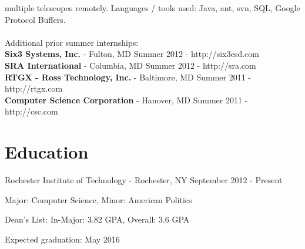 \documentclass[a4paper,margin,line]{resume}
\newcommand{\rdate}[1]{\hfill {\small #1}}
\begin{document}
\begin{resume}
\begin{asparadesc}
        multiple telescopes remotely. Languages / tools used: Java, ant, svn, SQL,
        Google Protocol Buffers.
        \normalsize
        \\
        \\
        Additional prior summer internships:\\
        \textbf{Six3 Systems, Inc.} - Fulton, MD \hfill Summer 2012 - http://six3esd.com \\
        \textbf{SRA International} - Columbia, MD \hfill Summer 2012 - http://sra.com \\
        \textbf{RTGX - Ross Technology, Inc.} - Baltimore, MD \hfill Summer 2011 - http://rtgx.com \\
        \textbf{Computer Science Corporation} - Hanover, MD \hfill Summer 2011 - http://csc.com
    \end{asparadesc}

\section{\mysidestyle Education}
	\begin{compactdesc}
		\item[Rochester Institute of Technology] - Rochester, NY \rdate{September 2012 - Present}
		\begin{compactitem} { \small
			\item Major: Computer Science, Minor: American Politics
            \item Dean's List: In-Major: 3.82 GPA, Overall: 3.6 GPA
			\item Expected graduation: May 2016
		} \end{compactitem}
	\end{compactdesc}


\end{resume}
\end{document}
